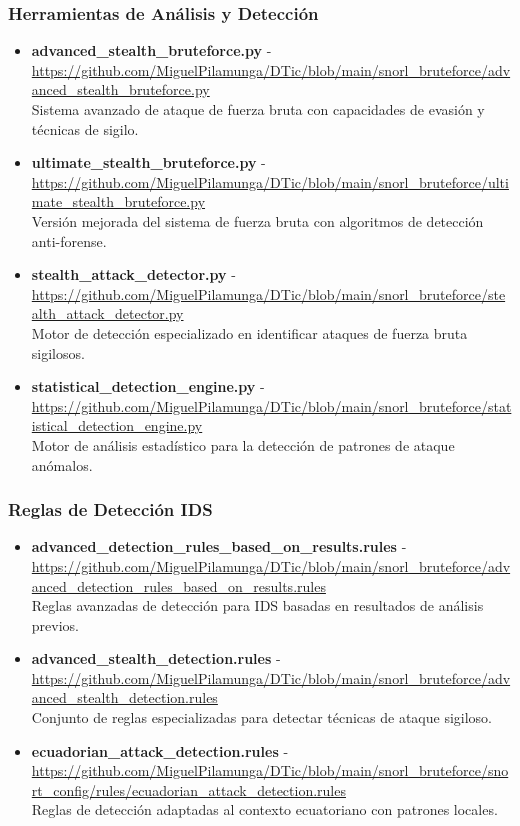 \subsubsection*{Herramientas de Análisis y Detección}
\begin{itemize}
    \item \textbf{advanced\_stealth\_bruteforce.py} - \url{https://github.com/MiguelPilamunga/DTic/blob/main/snorl_bruteforce/advanced_stealth_bruteforce.py} \\
    Sistema avanzado de ataque de fuerza bruta con capacidades de evasión y técnicas de sigilo.
    
    \item \textbf{ultimate\_stealth\_bruteforce.py} - \url{https://github.com/MiguelPilamunga/DTic/blob/main/snorl_bruteforce/ultimate_stealth_bruteforce.py} \\
    Versión mejorada del sistema de fuerza bruta con algoritmos de detección anti-forense.
    
    \item \textbf{stealth\_attack\_detector.py} - \url{https://github.com/MiguelPilamunga/DTic/blob/main/snorl_bruteforce/stealth_attack_detector.py} \\
    Motor de detección especializado en identificar ataques de fuerza bruta sigilosos.
    
    \item \textbf{statistical\_detection\_engine.py} - \url{https://github.com/MiguelPilamunga/DTic/blob/main/snorl_bruteforce/statistical_detection_engine.py} \\
    Motor de análisis estadístico para la detección de patrones de ataque anómalos.
\end{itemize}

\subsubsection*{Reglas de Detección IDS}
\begin{itemize}
    \item \textbf{advanced\_detection\_rules\_based\_on\_results.rules} - \url{https://github.com/MiguelPilamunga/DTic/blob/main/snorl_bruteforce/advanced_detection_rules_based_on_results.rules} \\
    Reglas avanzadas de detección para IDS basadas en resultados de análisis previos.
    
    \item \textbf{advanced\_stealth\_detection.rules} - \url{https://github.com/MiguelPilamunga/DTic/blob/main/snorl_bruteforce/advanced_stealth_detection.rules} \\
    Conjunto de reglas especializadas para detectar técnicas de ataque sigiloso.
    
    \item \textbf{ecuadorian\_attack\_detection.rules} - \url{https://github.com/MiguelPilamunga/DTic/blob/main/snorl_bruteforce/snort_config/rules/ecuadorian_attack_detection.rules} \\
    Reglas de detección adaptadas al contexto ecuatoriano con patrones locales.
\end{itemize}

